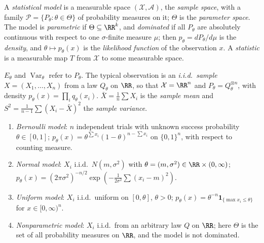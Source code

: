 \begin{definition}\label{statistics:definition-model}
A \emph{statistical model} is a measurable space $(\mathcal{X}, \mathcal{A})$, the \emph{sample space}, with a family $\mathcal{P} = \{P_\theta : \theta \in \Theta\}$ of probability measures on it; $\Theta$ is the \emph{parameter space}. The
model is \emph{parametric} if $\Theta \subseteq \RR^k$, and \emph{dominated} if all $P_\theta$ are absolutely continuous with respect to one $\sigma$-finite measure $\mu$; then $p_\theta = dP_\theta/d\mu$ is the \emph{density}, and
$\theta \mapsto p_\theta(x)$ is the \emph{likelihood function} of the observation $x$. A \emph{statistic} is a measurable map $T$ from $\mathcal{X}$ to some measurable space.
\end{definition}

\begin{notation}\label{statistics:notation-model}
$E_\theta$ and $\operatorname{Var}_\theta$ refer to $P_\theta$. The typical observation is an \emph{i.i.d.\ sample} $X = (X_1, \ldots, X_n)$ from a law $Q_\theta$ on $\RR$, so that $\mathcal{X} = \RR^n$ and $P_\theta = Q_\theta^{\otimes n}$,
with density $p_\theta(x) = \prod_iq_\theta(x_i)$. $\bar X = \frac1n\sum X_i$ is the \emph{sample mean} and $S^2 = \frac{1}{n - 1}\sum(X_i - \bar X)^2$ the \emph{sample variance}.
\end{notation}

\begin{example}\label{statistics:example-models}
\begin{enumerate}
\item \emph{Bernoulli model}: $n$ independent trials with unknown success probability $\theta \in [0, 1]$; $p_\theta(x) = \theta^{\sum x_i}(1 - \theta)^{n - \sum x_i}$ on $\{0, 1\}^n$, with respect to counting measure.
\item \emph{Normal model}: $X_i$ i.i.d.\ $N(m, \sigma^2)$ with $\theta = (m, \sigma^2) \in \RR \times (0, \infty)$; $p_\theta(x) = (2\pi\sigma^2)^{-n/2}\exp(-\frac{1}{2\sigma^2}\sum(x_i - m)^2)$.
\item \emph{Uniform model}: $X_i$ i.i.d.\ uniform on $[0, \theta]$, $\theta > 0$; $p_\theta(x) = \theta^{-n}\mathbf{1}_{\{\max x_i \leq \theta\}}$ for $x \in [0, \infty)^n$.
\item \emph{Nonparametric model}: $X_i$ i.i.d.\ from an arbitrary law $Q$ on $\RR$; here $\Theta$ is the set of all probability measures on $\RR$, and the model is not dominated.
\end{enumerate}
\end{example}

